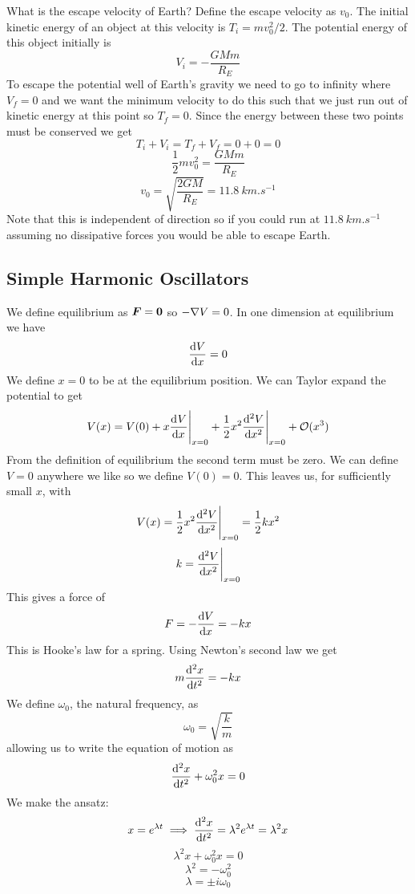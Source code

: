 \documentclass{article}
\begin{document}
    \example
    What is the escape velocity of Earth?
    Define the escape velocity as \(v_0\).
    The initial kinetic energy of an object at this velocity is \(T_i = mv_0^2/2\).
    The potential energy of this object initially is
    \[V_i = -\frac{GMm}{R_E}\]
    To escape the potential well of Earth's gravity we need to go to infinity where \(V_f = 0\) and we want the minimum velocity to do this such that we just run out of kinetic energy at this point so \(T_f = 0\).
    Since the energy between these two points must be conserved we get
    \[T_i + V_i = T_f + V_f = 0 + 0 = 0\]
    \[\frac{1}{2}mv_0^2 = \frac{GMm}{R_E}\]
    \[v_0 = \sqrt{\frac{2GM}{R_E}} = \SI{11.8}{km.s^{-1}}\]
    Note that this is independent of direction so if you could run at \(\SI{11.8}{km.s^{-1}}\) assuming no dissipative forces you would be able to escape Earth.
    
    \subsection{Simple Harmonic Oscillators}
    We define equilibrium as \(\bm{F} = \bm{0}\) so \(-\nabla V = 0\).
    In one dimension at equilibrium we have
    \[\dv{V}{x} = 0\]
    We define \(x = 0\) to be at the equilibrium position.
    We can Taylor expand the potential to get
    \[V(x) = V(0) + x\dv[]{V}{x}\Biggr|_{x=0} + \frac{1}{2}x^2\dv[2]{V}{x}\Biggr|_{x=0} + \mathcal O(x^3)\]
    From the definition of equilibrium the second term must be zero.
    We can define \(V = 0\) anywhere we like so we define \(V(0) = 0\).
    This leaves us, for sufficiently small \(x\), with
    \[V(x) = \frac{1}{2}x^2\dv[2]{V}{x}\Biggr|_{x=0} = \frac{1}{2}kx^2\]
    \[k = \dv[2]{V}{x}\Biggr|_{x=0}\]
    This gives a force of
    \[F = -\dv{V}{x} = -kx\]
    This is Hooke's law for a spring.
    Using Newton's second law we get
    \[m\dv[2]{x}{t} = -kx\]
    We define \(\omega_0\), the natural frequency, as
    \[\omega_0 = \sqrt{\frac{k}{m}}\]
    allowing us to write the equation of motion as
    \[\dv[2]{x}{t} + \omega_0^2x = 0\]
    We make the ansatz:
    \[x = e^{\lambda t}\implies \dv[2]{x}{t} = \lambda^2e^{\lambda t} = \lambda^2 x\]
    \[\lambda^2 x + \omega_0^2 x = 0\]
    \[\lambda^2 = -\omega_0^2\]
    \[\lambda = \pm i\omega_0\]
    
\end{document}
